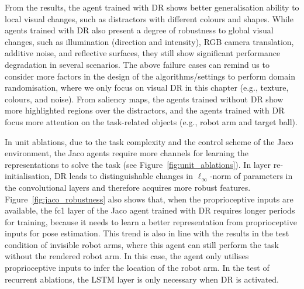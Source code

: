 From the results, the agent trained with DR shows better generalisation ability to local visual changes, such as distractors with different colours and shapes. While agents trained with DR also present a degree of robustness to global visual changes, such as illumination (direction and intensity), RGB camera translation, additive noise, and reflective surfaces, they still show significant performance degradation in several scenarios. The above failure cases can remind us to consider more factors in the design of the algorithms/settings to perform domain randomisation, where we only focus on visual DR in this chapter (e.g., texture, colours, and noise). From saliency maps, the agents trained without DR show more highlighted regions over the distractors, and the agents trained with DR focus more attention on the task-related objects (e.g., robot arm and target ball). 

In unit ablations, due to the task complexity and the control scheme of the Jaco environment, the Jaco agents require more channels for learning the representations to solve the task (see  Figure~\ref{fig:unit_ablations}). In layer re-initialisation, DR leads to distinguishable changes in $\ell_{\infty}$-norm of parameters in the convolutional layers and therefore acquires more robust features. Figure~\ref{fig:jaco_robustness} also shows that, when the proprioceptive inputs are available, the fc1 layer of the Jaco agent trained with DR requires longer periods for training,  because it needs to learn a better representation from proprioceptive inputs for pose estimation. This trend is also in line with the results in the test condition of invisible robot arms, where this agent can still perform the task without the rendered robot arm. In this case, the agent only utilises proprioceptive inputs to infer the location of the robot arm. In the test of recurrent ablations, the LSTM layer is only necessary when DR is activated.

